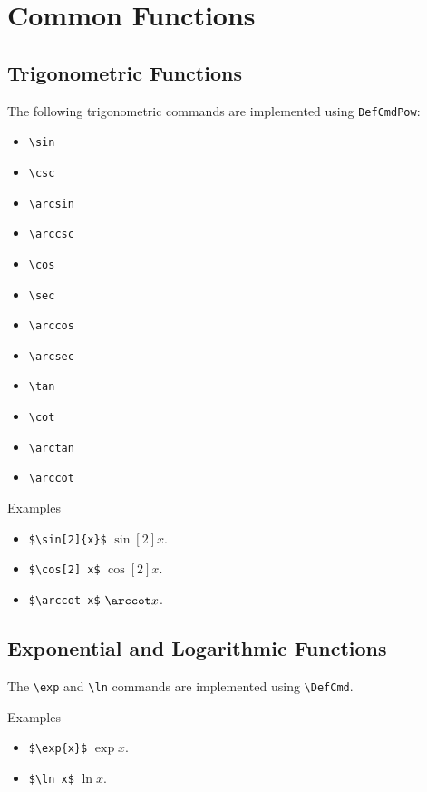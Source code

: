 \section{Common Functions}

\subsection{Trigonometric Functions}

The following trigonometric commands are implemented using \verb|DefCmdPow|:

\begin{multicols}{3}
    \begin{itemize}
        \item \verb|\sin|
        \item \verb|\csc|
        \item \verb|\arcsin|
        \item \verb|\arccsc|
        \item \verb|\cos|
        \item \verb|\sec|
        \item \verb|\arccos|
        \item \verb|\arcsec|
        \item \verb|\tan|
        \item \verb|\cot|
        \item \verb|\arctan|
        \item \verb|\arccot|
    \end{itemize}
\end{multicols}

\begin{myframe}{Examples}
    \begin{itemize}
        \item \verb|$\sin[2]{x}$| \produces{} $\sin[2]{x}$.
        \item \verb|$\cos[2] x$| \produces{} $\cos[2] x$.
        \item \verb|$\arccot x$| \produces{} $\arccot x$.
    \end{itemize}
    
\end{myframe}

\subsection{Exponential and Logarithmic Functions}

The \verb|\exp| and \verb|\ln| commands are implemented using \verb|\DefCmd|.

\begin{myframe}{Examples}
    \begin{itemize}
        \item \verb|$\exp{x}$| \produces{} $\exp{x}$.
        \item \verb|$\ln x$| \produces{} $\ln x$.
    \end{itemize}
\end{myframe}